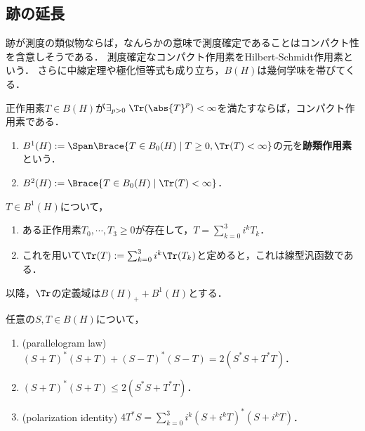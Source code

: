 \documentclass[uplatex,dvipdfmx]{jsreport}
\begin{document}
\subsection{跡の延長}

\begin{tcolorbox}[colframe=ForestGreen, colback=ForestGreen!10!white,breakable,colbacktitle=ForestGreen!40!white,coltitle=black,fonttitle=\bfseries\sffamily,
title=]
    跡が測度の類似物ならば，なんらかの意味で測度確定であることはコンパクト性を含意しそうである．
    測度確定なコンパクト作用素をHilbert-Schmidt作用素という．
    さらに中線定理や極化恒等式も成り立ち，$B(H)$は幾何学味を帯びてくる．
\end{tcolorbox}

\begin{lemma}
    正作用素$T\in B(H)$が$\exists_{p>0}\;\Tr(\abs{T}^p)<\infty$を満たすならば，コンパクト作用素である．
\end{lemma}

\begin{definition}\mbox{}\label{def-trace-class-Hilbert-Schmidt}
    \begin{enumerate}
        \item $B^1(H):=\Span\Brace{T\in B_0(H)\mid T\ge0,\Tr(T)<\infty}$の元を\textbf{跡類作用素}という．
        \item $B^2(H):=\Brace{T\in B_0(H)\mid\Tr(T)<\infty}$．
    \end{enumerate}
\end{definition}

\begin{lemma}[跡の延長]
    $T\in B^1(H)$について，
    \begin{enumerate}
        \item ある正作用素$T_0,\cdots,T_3\ge0$が存在して，$T=\sum_{k=0}^3i^kT_k$．
        \item これを用いて$\Tr(T):=\sum_{k=0}^3i^k\Tr(T_k)$と定めると，これは線型汎函数である．
    \end{enumerate}
    以降，$\Tr$の定義域は$B(H)_++B^1(H)$とする．
\end{lemma}

\begin{lemma}[作用素の中線定理と極化恒等式]
    任意の$S,T\in B(H)$について，
    \begin{enumerate}
        \item (parallelogram law) $(S+T)^*(S+T)+(S-T)^*(S-T)=2(S^*S+T^*T)$．
        \item $(S+T)^*(S+T)\le 2(S^*S+T^*T)$．
        \item (polarization identity) $4T^*S=\sum^3_{k=0}i^k(S+i^kT)^*(S+i^kT)$．
    \end{enumerate}
\end{lemma}
\end{document}
